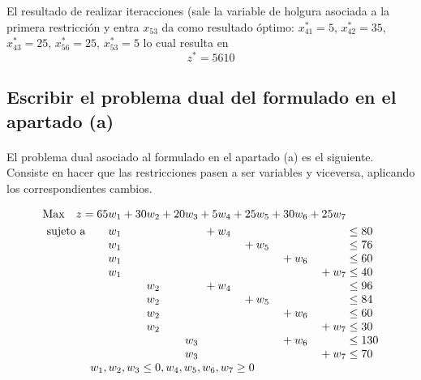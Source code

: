 \documentclass[10pt, a4paper]{article}
\begin{document}
			El resultado de realizar iteracciones (sale la variable de holgura asociada a la primera restricción y entra \(x_{53}\) da como resultado óptimo:
			\(x_{41}^{*} = 5 \), \(x_{42}^{*} = 35 \), \(x_{43}^{*} = 25 \), \(x_{56}^{*} = 25 \), \(x_{53}^{*} = 5 \) lo cual resulta en \[
				z^{*} = 5610
			\]

		\subsection{Escribir el problema dual del formulado en el apartado (a)}

			\paragraph{}
			El problema dual asociado al formulado en el apartado (a) es el siguiente. Consiste en hacer que las restricciones pasen a ser variables y viceversa, aplicando los correspondientes cambios.


			\[
			  \begin{array}{r@{}r@{}r@{}r@{}r@{}r@{}r@{}l}
			    \text{Max} \quad z = 65w_{1} &{} +30w_{2} &{} + 20w_{3} &{} + 5w_{4} &{} + 25w_{5} &{} + 30w_{6} &{} + 25w_{7} &{} \\[\jot]
			    \text{sujeto a}\qquad 	w_{1} &{} 		&{} 		&{} + w_{4} &{} &{} &{}  &{} \leq 80 \\
			                     		w_{1} &{} 		&{} 		&{} 		&{} + w_{5}&{} &{}  &{} \leq 76 \\
								 		w_{1} &{} 		&{} 		&{} 		&{} &{} + w_{6}&{}  &{} \leq 60 \\
								 		w_{1} &{} 		&{} 		&{} 		&{} &{} &{} + w_{7} &{} \leq 40  \\
								 		      &{} w_{2} &{} 		&{} + w_{4}	&{} &{} &{}  &{} \leq 96 \\
											  &{} w_{2} &{} 		&{} 		&{} + w_{5} &{} &{}  &{} \leq 84 \\
											  &{} w_{2} &{} 		&{} 		&{} &{} + w_{6}&{}  &{} \leq 60 \\
											  &{} w_{2} &{} 		&{} 		&{} &{} &{} + w_{7} &{} \leq 30 \\
											  &{} 		&{} w_{3} 	&{} 		&{} &{} + w_{6} &{}  &{} \leq 130 \\
											  &{} 		&{} w_{3} 	&{} 		&{} &{} &{} +w_{7} &{} \leq 70 \\
			     \multicolumn{6}{c}{w_{1}, w_{2}, w_{3} \leq 0, w_{4}, w_{5}, w_{6}, w_{7} \geq 0}


			  \end{array}
			\]
\end{document}
